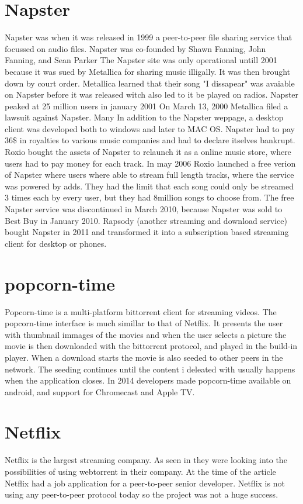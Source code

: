 \section{Napster}
Napster was when it was released in 1999 a peer-to-peer file sharing service that focussed on audio files. Napster was co-founded by Shawn Fanning, John Fanning, and Sean Parker The Napster site was only operational untill 2001 because it was sued by Metallica for sharing music illigally. It was then brought down by court order. Metallica learned that their song "I dissapear" was avaiable on Napster before it was released witch also led to it be played on radios. Napster peaked at 25 million users in january 2001 On March 13, 2000 Metallica filed a lawsuit against Napster. Many  In addition to the Napster weppage, a desktop client was developed both to windows and later to MAC OS.
Napster had to pay 36\$ in royalties to various music companies and had to declare itselves bankrupt. Roxio bought the assets of Napster to relaunch it as a online music store, where users had to pay money for each track. In may 2006 Roxio launched a free verion of Napster where users where able to stream full length tracks, where the service was powered by adds. They had the limit that each song could only be streamed 3 times each by every user, but they had 8million songs to choose from.
The free Napster service was discontinued in March 2010, because Napster was sold to Best Buy in January 2010.
Rapsody (another streaming and download service) bought Napster in 2011 and transformed it into a subscription based streaming client for desktop or phones.

\section{popcorn-time}
Popcorn-time is a multi-platform bittorrent client for streaming videos. The popcorn-time interface is much simillar to that of Netflix. It presents the user with thumbnail immages of the movies and when the user selects a picture the movie is then downloaded with the bittorrent protocol, and played in the build-in player.
 When a download starts the movie is also seeded to other peers in the network. The seeding continues until the content i deleated with usually happens when the application closes.
 In 2014 developers made popcorn-time available on android, and support for Chromecast and Apple TV.

\section{Netflix}
Netflix is the largest streaming company. As seen in \citep{netflix} they were looking into the possibilities of using webtorrent in their company. At the time of the article Netflix had a job application for a peer-to-peer senior developer. Netflix is not using any peer-to-peer protocol today so the project was not a huge success.
